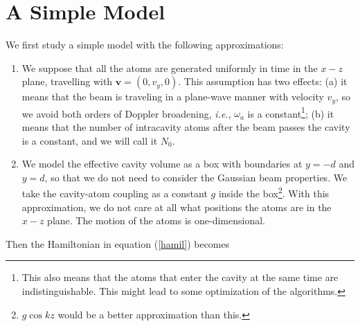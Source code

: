 \documentclass{article}
\newcommand{\omegaa}{\omega_a}
\newcommand{\omegac}{\omega_c}
\begin{document}




\section{A Simple Model}


We first study a simple model with the following approximations:
\begin{enumerate}
    \item We suppose that all the atoms are generated uniformly in time in the $x-z$ plane, travelling with $\textbf{v}=(0, v_y, 0)$. This assumption has two effects: (a) it means that the beam is traveling in a plane-wave manner with velocity $v_y$, so we avoid both orders of Doppler broadening, \textit{i.e.}, $\omegaa$ is a constant\footnote{This also means that the atoms that enter the cavity at the same time are indistinguishable. This might lead to some optimization of the algorithms.}; (b) it means that the number of intracavity atoms after the beam passes the cavity is a constant, and we will call it $N_0$.
    \item We model the effective cavity volume as a box with boundaries at $y=-d$ and $y=d$, so that we do not need to consider the Gaussian beam properties. We take the cavity-atom coupling as a constant $g$ inside the box\footnote{$g\cos{kz}$ would be a better approximation than this.}. With this approximation, we do not care at all what positions the atoms are in the $x-z$ plane. The motion of the atoms is one-dimensional.
\end{enumerate}

Then the Hamiltonian in equation (\ref{hamil}) becomes
\end{document}
